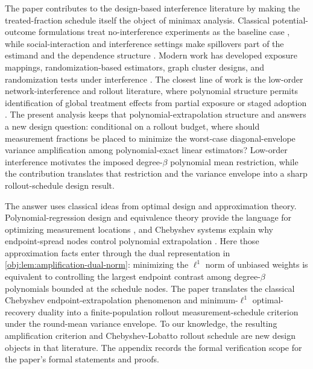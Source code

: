 The paper contributes to the design-based interference literature by making the treated-fraction schedule itself the object of minimax analysis. Classical potential-outcome formulations treat no-interference experiments as the baseline case \citep{rubin1974,imbens2015}, while social-interaction and interference settings make spillovers part of the estimand and the dependence structure \citep{manski1993,manski2013}. Modern work has developed exposure mappings, randomization-based estimators, graph cluster designs, and randomization tests under interference \citep{aronow2017,savje2017,eckles2017,ugander2013,athey2018,basse2019,puelz2019}. The closest line of work is the low-order network-interference and rollout literature, where polynomial structure permits identification of global treatment effects from partial exposure or staged adoption \citep{cortez2022,cortezrodriguez2022,cortezrodriguez2024,eichhorn2024}. The present analysis keeps that polynomial-extrapolation structure and answers a new design question: conditional on a rollout budget, where should measurement fractions be placed to minimize the worst-case diagonal-envelope variance amplification among polynomial-exact linear estimators? Low-order interference motivates the imposed degree-\(\beta\) polynomial mean restriction, while the contribution translates that restriction and the variance envelope into a sharp rollout-schedule design result.

The answer uses classical ideas from optimal design and approximation theory. Polynomial-regression design and equivalence theory provide the language for optimizing measurement locations \citep{smith1918,kiefer1959,kiefer1974,pukelsheim1993}, and Chebyshev systems explain why endpoint-spread nodes control polynomial extrapolation \citep{karlin1966}. Here those approximation facts enter through the dual representation in \cref{obj:lem:amplification-dual-norm}: minimizing the \(\ell^1\) norm of unbiased weights is equivalent to controlling the largest endpoint contrast among degree-\(\beta\) polynomials bounded at the schedule nodes. The paper translates the classical Chebyshev endpoint-extrapolation phenomenon and minimum-\(\ell^1\) optimal-recovery duality into a finite-population rollout measurement-schedule criterion under the round-mean variance envelope. To our knowledge, the resulting amplification criterion and Chebyshev-Lobatto rollout schedule are new design objects in that literature. The appendix records the formal verification scope for the paper's formal statements and proofs.
